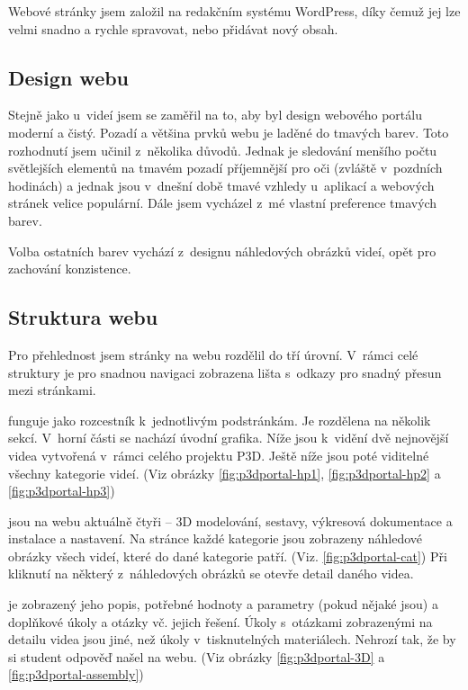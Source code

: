 Webové stránky jsem založil na redakčním systému WordPress, díky čemuž jej lze velmi snadno a rychle spravovat, nebo přidávat nový obsah.

\subsection{Design webu}
Stejně jako u~videí jsem se zaměřil na to, aby byl design webového portálu moderní a čistý.
Pozadí a většina prvků webu je laděné do tmavých barev.
Toto rozhodnutí jsem učinil z~několika důvodů.
Jednak je sledování menšího počtu světlejších elementů na tmavém pozadí příjemnější pro oči (zvláště v~pozdních hodinách) a jednak jsou v~dnešní době tmavé vzhledy u~aplikací a webových stránek velice populární.
Dále jsem vycházel z~mé vlastní preference tmavých barev.

Volba ostatních barev vychází z~designu náhledových obrázků videí, opět pro zachování konzistence.

\subsection{Struktura webu}
Pro přehlednost jsem stránky na webu rozdělil do tří úrovní. 
V~rámci celé struktury je pro snadnou navigaci zobrazena lišta s~odkazy pro snadný přesun mezi stránkami.

\noindent{} funguje jako rozcestník k~jednotlivým podstránkám. Je rozdělena na několik sekcí. V~horní části se nachází úvodní grafika. Níže jsou k~vidění dvě nejnovější videa vytvořená v~rámci celého projektu P3D. Ještě níže jsou poté viditelné všechny kategorie videí. (Viz obrázky \ref{fig:p3dportal-hp1}, \ref{fig:p3dportal-hp2} a \ref{fig:p3dportal-hp3})

\noindent{} jsou na webu aktuálně čtyři -- 3D modelování, sestavy, výkresová dokumentace a instalace a nastavení. Na stránce každé kategorie jsou zobrazeny náhledové obrázky všech videí, které do dané kategorie patří. (Viz. \autoref{fig:p3dportal-cat})
Při kliknutí na některý z~náhledových obrázků se otevře detail daného videa. 

\noindent{} je zobrazený jeho popis, potřebné hodnoty a parametry (pokud nějaké jsou) a doplňkové úkoly a otázky vč. jejich řešení. Úkoly s~otázkami zobrazenými na detailu videa jsou jiné, než úkoly v~tisknutelných materiálech. Nehrozí tak, že by si student odpověď našel na webu. (Viz obrázky \ref{fig:p3dportal-3D} a \ref{fig:p3dportal-assembly})

